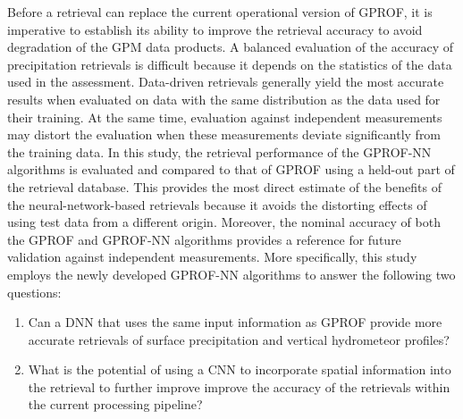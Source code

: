 \documentclass[journal abbreviation, manuscript]{copernicus}
\begin{document}
Before a retrieval can replace the current operational version of GPROF, it is
imperative to establish its ability to improve the retrieval accuracy to avoid
degradation of the GPM data products. A balanced evaluation of the accuracy of
precipitation retrievals is difficult because it depends on the statistics of
the data used in the assessment. Data-driven retrievals generally yield the most
accurate results when evaluated on data with the same distribution as the data
used for their training. At the same time, evaluation against independent
measurements may distort the evaluation when these measurements deviate
significantly from the training data. In this study, the retrieval performance
of the GPROF-NN algorithms is evaluated and compared to that of GPROF using a
held-out part of the retrieval database. This provides the most direct estimate
of the benefits of the neural-network-based retrievals because it avoids the
distorting effects of using test data from a different origin. Moreover, the
nominal accuracy of both the GPROF and GPROF-NN algorithms provides a reference
for future validation against independent measurements. More specifically, this
study employs the newly developed GPROF-NN algorithms to answer the following
two questions:
\begin{enumerate}
\item Can a DNN that uses the same input information as GPROF
  provide more accurate  retrievals of surface precipitation
  and vertical
  hydrometeor profiles?
\item What is the potential of using a CNN to incorporate spatial
  information into the retrieval to further improve improve the
  accuracy of the retrievals within
  the current processing pipeline?
\end{enumerate}

\end{document}

